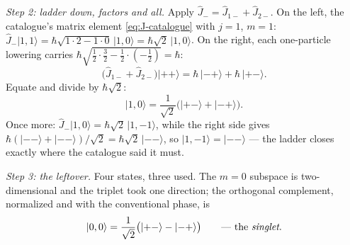 \documentclass[11pt]{article}
\theoremstyle{plain}
\theoremstyle{definition}
\theoremstyle{remark}
\newcommand{\op}[1]{\hat{#1}}
\newcommand{\ket}[1]{\lvert #1 \rangle}
\begin{document}
\emph{Step 2: ladder down, factors and all.} Apply $\op J_- =
\op J_{1-} + \op J_{2-}$. On the left, the catalogue's matrix
element \eqref{eq:J-catalogue} with $j = 1$, $m = 1$:
$\op J_-\ket{1,1} = \hbar\sqrt{1\cdot2 - 1\cdot0}\,\ket{1,0}
= \hbar\sqrt2\,\ket{1, 0}$. On the right, each one-particle
lowering carries $\hbar\sqrt{\frac12\cdot\frac32 -
\frac12\cdot(-\frac12)} = \hbar$:
\begin{equation}
  \bigl(\op J_{1-} + \op J_{2-}\bigr)\ket{++}
  = \hbar\,\ket{-+} + \hbar\,\ket{+-}.
\end{equation}
Equate and divide by $\hbar\sqrt2$:
\begin{equation}
  \ket{1, 0}
  = \frac{1}{\sqrt2}\bigl(\ket{+-} + \ket{-+}\bigr).
\end{equation}
Once more: $\op J_-\ket{1,0} = \hbar\sqrt2\,\ket{1,-1}$, while the
right side gives $\hbar(\ket{--} + \ket{--})/\sqrt2 =
\hbar\sqrt2\,\ket{--}$, so $\ket{1,-1} = \ket{--}$ --- the ladder
closes exactly where the catalogue said it must.

\emph{Step 3: the leftover.} Four states, three used. The $m = 0$
subspace is two-dimensional and the triplet took one direction; the
orthogonal complement, normalized and with the conventional phase,
is
\begin{equation}
  \ket{0, 0}
  = \frac{1}{\sqrt2}\bigl(\ket{+-} - \ket{-+}\bigr)
  \qquad\text{--- the \emph{singlet}.}
\end{equation}
\end{document}
